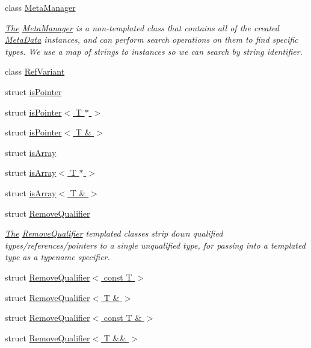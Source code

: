 \begin{DoxyCompactItemize}
class \hyperlink{classDCEngine_1_1MetaManager}{Meta\-Manager}
\begin{DoxyCompactList}\small\item\em \hyperlink{classThe}{The} \hyperlink{classDCEngine_1_1MetaManager}{Meta\-Manager} is a non-\/templated class that contains all of the created \hyperlink{classDCEngine_1_1MetaData}{Meta\-Data} instances, and can perform search operations on them to find specific types. We use a map of strings to instances so we can search by string identifier. \end{DoxyCompactList}\item 
class \hyperlink{classDCEngine_1_1RefVariant}{Ref\-Variant}
\item 
struct \hyperlink{structDCEngine_1_1isPointer}{is\-Pointer}
\item 
struct \hyperlink{structDCEngine_1_1isPointer_3_01T_01_5_01_4}{is\-Pointer$<$ T $\ast$ $>$}
\item 
struct \hyperlink{structDCEngine_1_1isPointer_3_01T_01_6_01_4}{is\-Pointer$<$ T \& $>$}
\item 
struct \hyperlink{structDCEngine_1_1isArray}{is\-Array}
\item 
struct \hyperlink{structDCEngine_1_1isArray_3_01T_01_5_01_4}{is\-Array$<$ T $\ast$ $>$}
\item 
struct \hyperlink{structDCEngine_1_1isArray_3_01T_01_6_01_4}{is\-Array$<$ T \& $>$}
\item 
struct \hyperlink{structDCEngine_1_1RemoveQualifier}{Remove\-Qualifier}
\begin{DoxyCompactList}\small\item\em \hyperlink{classThe}{The} \hyperlink{structDCEngine_1_1RemoveQualifier}{Remove\-Qualifier} templated classes strip down qualified types/references/pointers to a single unqualified type, for passing into a templated type as a typename specifier. \end{DoxyCompactList}\item 
struct \hyperlink{structDCEngine_1_1RemoveQualifier_3_01const_01T_01_4}{Remove\-Qualifier$<$ const T $>$}
\item 
struct \hyperlink{structDCEngine_1_1RemoveQualifier_3_01T_01_6_01_4}{Remove\-Qualifier$<$ T \& $>$}
\item 
struct \hyperlink{structDCEngine_1_1RemoveQualifier_3_01const_01T_01_6_01_4}{Remove\-Qualifier$<$ const T \& $>$}
\item 
struct \hyperlink{structDCEngine_1_1RemoveQualifier_3_01T_01_6_6_01_4}{Remove\-Qualifier$<$ T \&\& $>$}
\item 

\end{DoxyCompactItemize}
